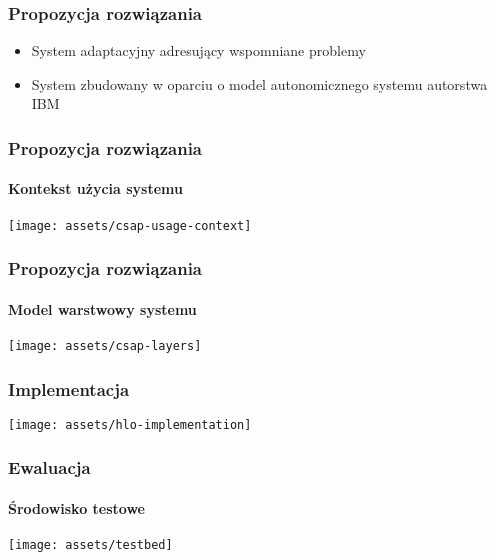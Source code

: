 \documentclass{beamer}
\begin{document}
\begin{frame}
\frametitle{Propozycja rozwiązania}

\begin{itemize}
	\item System adaptacyjny adresujący wspomniane problemy
	\item System zbudowany w oparciu o model autonomicznego systemu autorstwa IBM
\end{itemize}


\end{frame}





\begin{frame}
\frametitle{Propozycja rozwiązania}
\framesubtitle{Kontekst użycia systemu}
\vspace{2 mm}
\begin{center}

\texttt{[image: assets/csap-usage-context]}
\end{center}

\end{frame}



\begin{frame}
\frametitle{Propozycja rozwiązania}
\framesubtitle{Model warstwowy systemu}
\vspace{2 mm}
\begin{center}
\texttt{[image: assets/csap-layers]}
\end{center}
\end{frame}



\begin{frame}
\frametitle{Implementacja}

\vspace{2 mm}
\begin{center}
\texttt{[image: assets/hlo-implementation]}
\end{center}
\end{frame}



\begin{frame}
\frametitle{Ewaluacja}
\framesubtitle{Środowisko testowe}

\begin{center}

\texttt{[image: assets/testbed]}
\end{center}

\end{frame}
\end{document}
